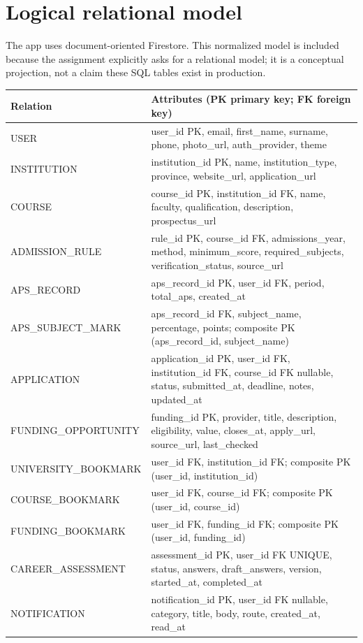 \documentclass[11pt,a4paper]{article}
\begin{document}
\section{Logical relational model}
The app uses document-oriented Firestore. This normalized model is included because the assignment explicitly asks for a relational model; it is a conceptual projection, not a claim these SQL tables exist in production.
\begin{longtable}{p{}p{}}
\toprule
\textbf{Relation} & \textbf{Attributes (PK primary key; FK foreign key)}\\
\midrule
USER & user\_id PK, email, first\_name, surname, phone, photo\_url, auth\_provider, theme\\
INSTITUTION & institution\_id PK, name, institution\_type, province, website\_url, application\_url\\
COURSE & course\_id PK, institution\_id FK, name, faculty, qualification, description, prospectus\_url\\
ADMISSION\_RULE & rule\_id PK, course\_id FK, admissions\_year, method, minimum\_score, required\_subjects, verification\_status, source\_url\\
APS\_RECORD & aps\_record\_id PK, user\_id FK, period, total\_aps, created\_at\\
APS\_SUBJECT\_MARK & aps\_record\_id FK, subject\_name, percentage, points; composite PK (aps\_record\_id, subject\_name)\\
APPLICATION & application\_id PK, user\_id FK, institution\_id FK, course\_id FK nullable, status, submitted\_at, deadline, notes, updated\_at\\
FUNDING\_OPPORTUNITY & funding\_id PK, provider, title, description, eligibility, value, closes\_at, apply\_url, source\_url, last\_checked\\
UNIVERSITY\_BOOKMARK & user\_id FK, institution\_id FK; composite PK (user\_id, institution\_id)\\
COURSE\_BOOKMARK & user\_id FK, course\_id FK; composite PK (user\_id, course\_id)\\
FUNDING\_BOOKMARK & user\_id FK, funding\_id FK; composite PK (user\_id, funding\_id)\\
CAREER\_ASSESSMENT & assessment\_id PK, user\_id FK UNIQUE, status, answers, draft\_answers, version, started\_at, completed\_at\\
NOTIFICATION & notification\_id PK, user\_id FK nullable, category, title, body, route, created\_at, read\_at\\
\bottomrule
\end{longtable}
\end{document}
